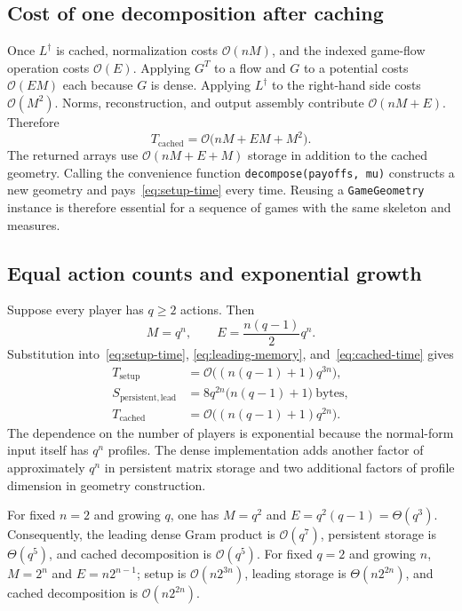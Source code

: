 \documentclass[11pt]{article}
\newcommand{\cO}{\mathcal{O}}
\begin{document}
\subsection{Cost of one decomposition after caching}

Once $L^\dagger$ is cached, normalization costs $\cO(nM)$, and the indexed
game-flow operation costs $\cO(E)$.  Applying $G^T$ to a flow and $G$ to a
potential costs $\cO(EM)$ each because $G$ is dense.  Applying $L^\dagger$ to
the right-hand side costs $\cO(M^2)$.  Norms, reconstruction, and output
assembly contribute $\cO(nM+E)$.  Therefore
\begin{equation}
 T_{\mathrm{cached}}
 =\cO\bigl(nM+EM+M^2\bigr).
 \label{eq:cached-time}
\end{equation}
The returned arrays use $\cO(nM+E+M)$ storage in addition to the cached
geometry.  Calling the convenience function \texttt{decompose(payoffs, mu)}
constructs a new geometry and pays~\eqref{eq:setup-time} every time.  Reusing a
\texttt{GameGeometry} instance is therefore essential for a sequence of games
with the same skeleton and measures.

\subsection{Equal action counts and exponential growth}

Suppose every player has $q\geq2$ actions.  Then
\begin{equation}
M=q^n,\qquad E=\frac{n(q-1)}{2}q^n.
 \label{eq:balanced-counts}
\end{equation}
Substitution into~\eqref{eq:setup-time},
\eqref{eq:leading-memory}, and~\eqref{eq:cached-time} gives
\begin{align}
 T_{\mathrm{setup}}
   &=\cO\bigl((n(q-1)+1)q^{3n}\bigr),
   \label{eq:balanced-setup}\\
 S_{\mathrm{persistent,lead}}
   &=8q^{2n}\bigl(n(q-1)+1\bigr)\ \text{bytes},
   \label{eq:balanced-memory}\\
 T_{\mathrm{cached}}
   &=\cO\bigl((n(q-1)+1)q^{2n}\bigr).
   \label{eq:balanced-cached}
\end{align}
The dependence on the number of players is exponential because the normal-form
input itself has $q^n$ profiles.  The dense implementation adds another factor
of approximately $q^n$ in persistent matrix storage and two additional factors
of profile dimension in geometry construction.

For fixed $n=2$ and growing $q$, one has $M=q^2$ and
$E=q^2(q-1)=\Theta(q^3)$.  Consequently, the leading dense Gram product is
$\cO(q^7)$, persistent storage is $\Theta(q^5)$, and cached decomposition is
$\cO(q^5)$.  For fixed $q=2$ and growing $n$,
$M=2^n$ and $E=n2^{n-1}$; setup is $\cO(n2^{3n})$, leading storage is
$\Theta(n2^{2n})$, and cached decomposition is $\cO(n2^{2n})$.
\end{document}
